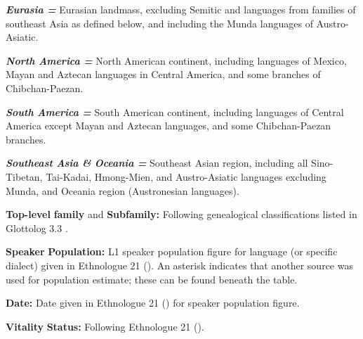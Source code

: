 \begin{styleBody}
\textbf{\textit{Eurasia} \textit{=}} Eurasian landmass, excluding Semitic and languages from families of southeast Asia as defined below, and including the Munda languages of Austro-Asiatic. 
\end{styleBody}

\begin{styleBody}
\textbf{\textit{North} \textit{America} \textit{=} }North American continent, including languages of Mexico, Mayan and Aztecan languages in Central America, and some branches of Chibchan-Paezan. 
\end{styleBody}

\begin{styleBody}
\textbf{\textit{South} \textit{America} \textit{=}} South American continent, including languages of Central America except Mayan and Aztecan languages, and some Chibchan-Paezan branches. 
\end{styleBody}

\begin{styleBody}
\textbf{\textit{Southeast} \textit{Asia} \textit{\&} \textit{Oceania} \textit{=} }Southeast Asian region, including all Sino-Tibetan, Tai-Kadai, Hmong-Mien, and Austro-Asiatic languages excluding Munda, and Oceania region (Austronesian languages).
\end{styleBody}

\begin{styleBody}
\textbf{Top-level} \textbf{family} and \textbf{Subfamily:} Following genealogical classifications listed in Glottolog 3.3 \citep{HammarströmEtAl2018}.
\end{styleBody}

\begin{styleBody}
\textbf{Speaker} \textbf{Population:} L1 speaker population figure for language (or specific dialect) given in Ethnologue 21 (\citealt{SimonsFennig2018}). An asterisk indicates that another source was used for population estimate; these can be found beneath the table.
\end{styleBody}

\begin{styleBody}
\textbf{Date:} Date given in Ethnologue 21 (\citealt{SimonsFennig2018}) for speaker population figure.
\end{styleBody}

\begin{styleBody}
\textbf{Vitality} \textbf{Status:} Following Ethnologue 21 (\citealt{SimonsFennig2018}). 
\end{styleBody}

